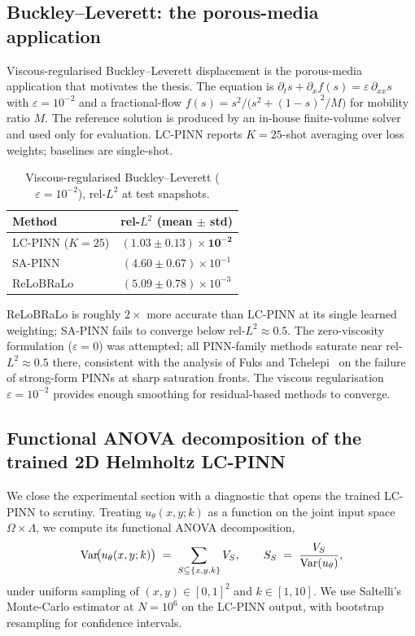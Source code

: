 \documentclass[12pt,a4paper]{extarticle}
\begin{document}
\subsection{Buckley--Leverett: the porous-media application}

Viscous-regularised Buckley--Leverett displacement is the porous-media application that motivates the thesis. The equation is $\partial_t s + \partial_x f(s) = \varepsilon\, \partial_{xx} s$ with $\varepsilon = 10^{-2}$ and a fractional-flow $f(s) = s^2 / \bigl( s^2 + (1 - s)^2 / M \bigr)$ for mobility ratio $M$. The reference solution is produced by an in-house finite-volume solver and used only for evaluation. LC-PINN reports $K = 25$-shot averaging over loss weights; baselines are single-shot.

\begin{table}[H]
\caption{Viscous-regularised Buckley--Leverett ($\varepsilon = 10^{-2}$), rel-$L^2$ at test snapshots.}
\label{table:bl}
\centering
\begin{tabular}{lc}
\toprule
Method & rel-$L^2$ (mean $\pm$ std) \\
\midrule
LC-PINN ($K = 25$) & $\mathbf{(1.03 \pm 0.13) \times 10^{-2}}$ \\
SA-PINN            & $(4.60 \pm 0.67) \times 10^{-1}$ \\
ReLoBRaLo          & $(5.09 \pm 0.78) \times 10^{-3}$ \\
\bottomrule
\end{tabular}
\end{table}

ReLoBRaLo is roughly $2\times$ more accurate than LC-PINN at its single learned weighting; SA-PINN fails to converge below rel-$L^2 \approx 0.5$. The zero-viscosity formulation ($\varepsilon = 0$) was attempted; all PINN-family methods saturate near rel-$L^2 \approx 0.5$ there, consistent with the analysis of Fuks and Tchelepi~\cite{fuks2020limitations} on the failure of strong-form PINNs at sharp saturation fronts. The viscous regularisation $\varepsilon = 10^{-2}$ provides enough smoothing for residual-based methods to converge.

\subsection{Functional ANOVA decomposition of the trained 2D Helmholtz LC-PINN}
\label{subsec:anova}

We close the experimental section with a diagnostic that opens the trained LC-PINN to scrutiny. Treating $u_\theta(x, y; k)$ as a function on the joint input space $\Omega \times \Lambda$, we compute its functional ANOVA decomposition,
\begin{equation}
    \operatorname{Var}\!\bigl(u_\theta(x, y; k)\bigr) \;=\; \sum_{S \subseteq \{x, y, k\}} V_S,
    \qquad S_S \;=\; \frac{V_S}{\operatorname{Var}(u_\theta)},
    \label{eq:anova-decomp}
\end{equation}
under uniform sampling of $(x, y) \in [0, 1]^2$ and $k \in [1, 10]$. We use Saltelli's Monte-Carlo estimator at $N = 10^6$ on the LC-PINN output, with bootstrap resampling for confidence intervals.
\end{document}
